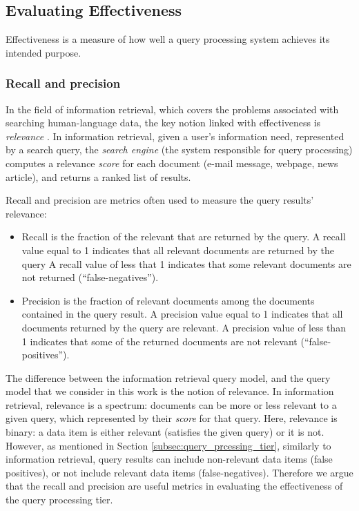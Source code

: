 \subsection{Evaluating Effectiveness}

Effectiveness is a measure of how well a query processing system achieves its intended purpose.

\subsubsection{Recall and precision}

In the field of information retrieval, which covers the problems associated with searching human-language data,
the key notion linked with effectiveness is \textit{relevance} \cite{buttcher:informationretrieval}.
In information retrieval, given a user's information need, represented by a search query, the \textit{search engine}
(the system responsible for query processing) computes a relevance \textit{score} for each document (e-mail message,
webpage, news article), and returns a ranked list of results.

Recall and precision are metrics often used to measure the query results' relevance:
\begin{itemize}
  \item Recall is the fraction of the relevant that are returned by the query.
  A recall value equal to 1 indicates that all relevant documents are returned by the query
  A recall value of less that 1 indicates that some relevant documents are not returned (``false-negatives'').

  \item Precision is the fraction of relevant documents among the documents contained in the query result.
  A precision value equal to 1 indicates that all documents returned by the query are relevant.
  A precision value of less than 1 indicates that some of the returned documents are not relevant (``false-positives'').
\end{itemize}

The difference between the information retrieval query model, and the query model that we consider in this work is the
notion of relevance.
In information retrieval, relevance is a spectrum: documents can be more or less relevant to a given query, which
represented by their \textit{score} for that query.
Here, relevance is binary: a data item is either relevant (satisfies the given query) or it is not.
However, as mentioned in Section \ref{subsec:query_prcessing_tier}, similarly to information retrieval, query results
can include non-relevant data items (false positives), or not include relevant data items (false-negatives).
Therefore we argue that the recall and precision are useful metrics in evaluating the effectiveness of the query
processing tier.

